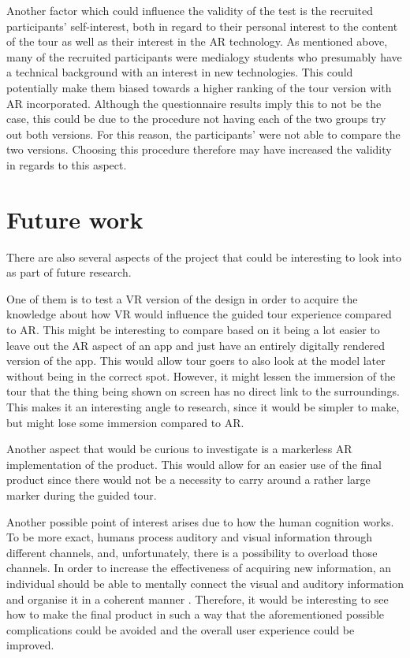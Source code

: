 Another factor which could influence the validity of the test is the recruited participants’ self-interest, both in regard to their personal interest to the content of the tour as well as their interest in the AR technology. As mentioned above, many of the recruited participants were medialogy students who presumably have a technical background with an interest in new technologies. This could potentially make them biased towards a higher ranking of the tour version with AR incorporated. Although the questionnaire results imply this to not be the case, this could be due to the procedure not having each of the two groups try out both versions. For this reason, the participants’ were not able to compare the two versions. Choosing this procedure therefore may have increased the validity in regards to this aspect.  

\section{Future work}
There are also several aspects of the project that could be interesting to look into as part of future research. 

One of them is to test a VR version of the design in order to acquire the knowledge about how VR would influence the guided tour experience compared to AR. This might be interesting to compare based on it being a lot easier to leave out the AR aspect of an app and just have an entirely digitally rendered version of the app. This would allow tour goers to also look at the model later without being in the correct spot. However, it might lessen the immersion of the tour that the thing being shown on screen has no direct link to the surroundings. This makes it an interesting angle to research, since it would be simpler to make, but might lose some immersion compared to AR. 

Another aspect that would be curious to investigate is a markerless AR implementation of the product. This would allow for an easier use of the final product since there would not be a necessity to carry around a rather large marker during the guided tour.
  
Another possible point of interest arises due to how the human cognition works. To be more exact, humans process auditory and visual information through different channels, and, unfortunately, there is a possibility to overload those channels. In order to increase the effectiveness of acquiring new information, an individual should be able to mentally connect the visual and auditory information and organise it in a coherent manner \cite{audiovisual_learning}. Therefore, it would be interesting to see how to make the final product in such a way that the aforementioned possible complications could be avoided and the overall user experience could be improved.

